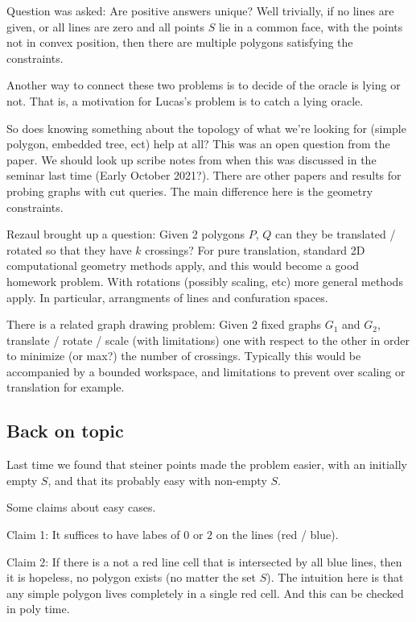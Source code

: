 \documentclass{article}
\begin{document}
Question was asked: Are positive answers unique?
Well trivially, if no lines are given, or all lines are zero and all points $S$ lie in a common face, 
with the points not in convex position, then there are multiple polygons satisfying the constraints.

Another way to connect these two problems is to decide of the oracle is lying or not. 
That is, a motivation for Lucas's problem is to catch a lying oracle.

So does knowing something about the topology of what we're looking for (simple polygon, embedded tree, ect) help at all?
This was an open question from the paper.
We should look up scribe notes from when this was discussed in the seminar last time (Early October 2021?).
There are other papers and results for probing graphs with cut queries.
The main difference here is the geometry constraints.

Rezaul brought up a question: Given 2 polygons $P$, $Q$ can they be translated / rotated so that they have $k$ crossings?
For pure translation, standard 2D 
computational geometry methods apply, and this would become a good homework problem.
With rotations (possibly scaling, etc) more general methods apply.
In particular, arrangments of lines and confuration spaces.

There is a related graph drawing problem: Given $2$ fixed graphs $G_1$ and $G_2$, translate / rotate / scale (with limitations) one with respect to the other
in order to minimize (or max?) the number of crossings. 
Typically this would be accompanied by a bounded workspace, and limitations to prevent over scaling or translation for example.

\subsection{Back on topic}

Last time we found that steiner points made the problem easier, with an initially empty $S$, and that its probably easy with non-empty $S$.

Some claims about easy cases.

Claim 1: 
It suffices to have labes of $0$ or $2$ on the lines (red / blue).

Claim 2:
If there is a not a red line cell that is intersected by all blue lines, then it is hopeless, no polygon exists (no matter the set $S$).
The intuition here is that any simple polygon lives completely in a single red cell. And this can be checked in poly time.
\end{document}
